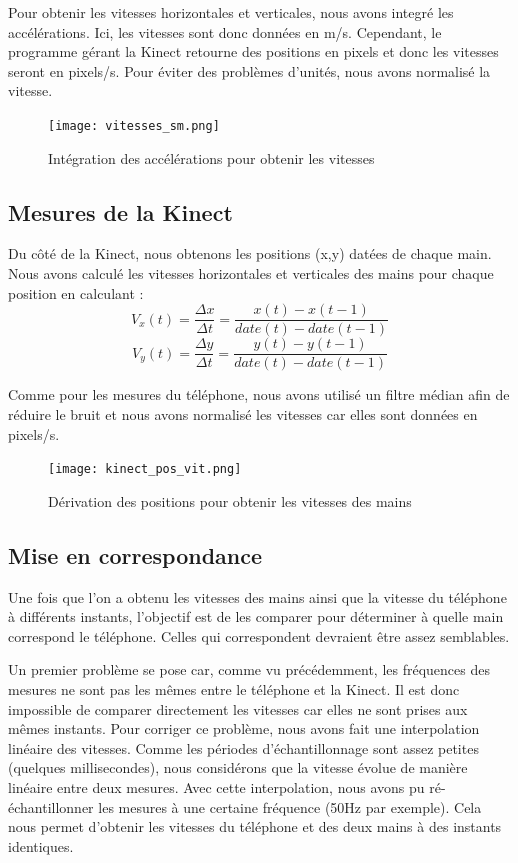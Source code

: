 \documentclass[12pt, french]{article}
\begin{document}
Pour obtenir les vitesses horizontales et verticales, nous avons integré  les accélérations. Ici, les vitesses sont donc données en m/s. Cependant, le programme gérant la Kinect retourne des positions en pixels et donc les vitesses seront en pixels/s. Pour éviter des problèmes d'unités, nous avons normalisé la vitesse.


\begin{figure}[h]
\centering
\texttt{[image: vitesses\_sm.png]}
\caption{Intégration des accélérations pour obtenir les vitesses}
\label{fig8}
\end{figure}

\subsection{Mesures de la Kinect}

Du côté de la Kinect, nous obtenons les positions (x,y) datées de chaque main. Nous avons calculé les vitesses horizontales et verticales des mains pour chaque position en calculant :
\[V_x(t) = \frac{\Delta x}{\Delta t}=\frac{x(t)-x(t-1)}{date(t)-date(t-1)}\] 
\[V_y(t) = \frac{\Delta y}{\Delta t}=\frac{y(t)-y(t-1)}{date(t)-date(t-1)}\]

Comme pour les mesures du téléphone, nous avons utilisé un filtre médian afin de réduire le bruit et nous avons normalisé les vitesses car elles sont données en pixels/s.


\begin{figure}[H]
\centering
\texttt{[image: kinect\_pos\_vit.png]}
\caption{Dérivation des positions pour obtenir les vitesses des mains}
\label{fig9}
\end{figure}

\subsection{Mise en correspondance}

Une fois que l'on a obtenu les vitesses des mains ainsi que la vitesse du téléphone à différents instants, l'objectif est de les comparer pour déterminer à quelle main correspond le téléphone. Celles qui correspondent devraient être assez semblables.

Un premier problème se pose car, comme vu précédemment, les fréquences des mesures ne sont pas les mêmes entre le téléphone et la Kinect. Il est donc impossible de comparer directement les vitesses car elles ne sont prises aux mêmes instants. Pour corriger ce problème, nous avons fait une interpolation linéaire des vitesses. Comme les périodes d'échantillonnage sont assez petites (quelques millisecondes), nous considérons que la vitesse évolue de manière linéaire entre deux mesures. Avec cette interpolation, nous avons pu  ré-échantillonner les mesures à une certaine fréquence (50Hz par exemple). Cela nous permet  d'obtenir les vitesses du téléphone et des deux mains à des instants identiques.
\end{document}
